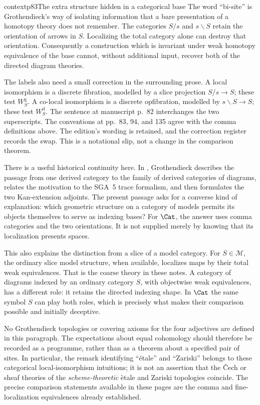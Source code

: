 \begin{dcomment}{context}{p83}{The extra structure hidden in a categorical base}
The word ``bi-site'' is Grothendieck's way of isolating information that a bare presentation of a homotopy theory does not remember. The categories $S/s$ and $s\backslash S$ retain the orientation of arrows in $S$. Localizing the total category alone can destroy that orientation. Consequently a construction which is invariant under weak homotopy equivalence of the base cannot, without additional input, recover both of the directed diagram theories.


The labels also need a small correction in the surrounding prose. A local
isomorphism is a discrete fibration, modelled by a slice projection $S/s\to S$;
these test $W_S^{\mathrm g}$. A co-local isomorphism is a discrete opfibration,
modelled by $s\backslash S\to S$; these test $W_S^{\mathrm d}$. The sentence at
manuscript p.~82 interchanges the two superscripts. The conventions at pp.~83,
94, and 135 agree with the comma definitions above. The edition's wording is
retained, and the correction register records the swap. This is a notational
slip, not a change in the comparison theorem.

There is a useful historical continuity here. In \citet[\S69, pp.~1--3 of the edited extract]{Grothendieck1983}, Grothendieck describes the passage from one derived category to the family of derived categories of diagrams, relates the motivation to the SGA~5 trace formalism, and then formulates the two Kan-extension adjoints. The present passage asks for a converse kind of explanation: which geometric structure on a category of models permits its objects themselves to serve as indexing bases? For $\Cat$, the answer uses comma categories and the two orientations. It is not supplied merely by knowing that its localization presents spaces.

This also explains the distinction from a slice of a model category. For $S\in\mathcal M$, the ordinary slice model structure, when available, localizes maps by their total weak equivalences. That is the coarse theory in these notes. A category of diagrams indexed by an ordinary category $S$, with objectwise weak equivalences, has a different role: it retains the directed indexing shape. In $\Cat$ the same symbol $S$ can play both roles, which is precisely what makes their comparison possible and initially deceptive.

No Grothendieck topologies or covering axioms for the four adjectives are defined in this paragraph. The expectations about equal cohomology should therefore be recorded as a programme, rather than as a theorem about a specified pair of sites. In particular, the remark identifying ``\'etale'' and ``Zariski'' belongs to these categorical local-isomorphism intuitions; it is not an assertion that the \v{C}ech or sheaf theories of the \emph{scheme-theoretic} \`etale and Zariski topologies coincide. The precise comparison statements available in these pages are the comma and fine-localization equivalences already established.
\end{dcomment}

